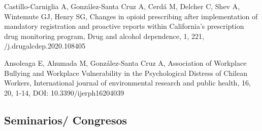 \documentclass[11pt,a4paper,]{awesome-cv}
\begin{document}
\begin{cventries}
{\begin{cvitems}
\item Castillo-Carniglia A, González-Santa Cruz A, Cerdá M, Delcher C, Shev A, Wintemute GJ, Henry SG, Changes in opioid prescribing after implementation of mandatory registration and proactive reports within California's prescription drug monitoring program, Drug and alcohol dependence, 1, 221, /j.drugalcdep.2020.108405
\item Ansoleaga E, Ahumada M, González-Santa Cruz A, Association of Workplace Bullying and Workplace Vulnerability in the Psychological Distress of Chilean Workers, International journal of environmental research and public health, 16, 20, 1-14, DOI: 10.3390/ijerph16204039
\end{cvitems}}
\end{cventries}

\hypertarget{seminarios-congresos}{%
\subsection{Seminarios/ Congresos}\label{seminarios-congresos}}
\end{document}
